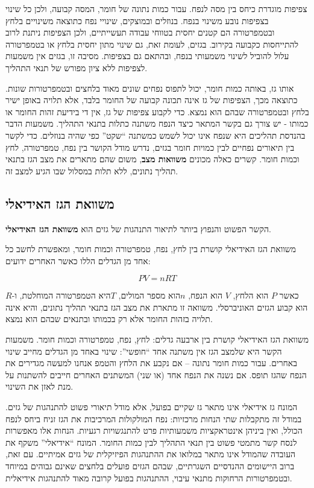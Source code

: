 \documentclass[
  hebrew,
  letterpaper,
  DIV=11,
  numbers=noendperiod]{scrreprt}
\begin{document}
צפיפות מוגדרת כיחס בין מסה לנפח. עבור כמות נתונה של חומר, המסה קבועה,
ולכן כל שינוי בצפיפות נובע משינוי בנפח. בנוזלים ובמוצקים, שינויי נפח
כתוצאה משינויים בלחץ ובטמפרטורה הם קטנים יחסית בטווחי עבודה תעשייתיים,
ולכן הצפיפות ניתנת לרוב להתייחסות כקבועה בקירוב. בגזים, לעומת זאת, גם
שינוי מתון יחסית בלחץ או בטמפרטורה עלול להוביל לשינוי משמעותי בנפח,
ובהתאם גם בצפיפות. מסיבה זו, בגזים אין משמעות לצפיפות ללא ציון מפורש של
תנאי התהליך.

אותו גז, באותה כמות חומר, יכול לתפוס נפחים שונים מאוד בלחצים ובטמפרטורות
שונות. כתוצאה מכך, הצפיפות של גז אינה תכונה קבועה של החומר בלבד, אלא
תלויה באופן ישיר בלחץ ובטמפרטורה שבהם הוא נמצא. כדי לקבוע צפיפות של גז,
אין די בידיעת זהות החומר או כמותו - יש צורך גם בקשר המתאר כיצד הנפח
משתנה כתלות בתנאי התהליך. משמעות הדבר בהנדסת תהליכים היא שנפח אינו יכול
לשמש כמשתנה ``שקט'' כפי שהיה בנוזלים. כדי לקשר בין תיאורים נפחיים לבין
כמויות חומר בגזים, נדרש מודל הקושר בין נפח, טמפרטורה, לחץ וכמות חומר.
קשרים כאלה מכונים \textbf{משוואות מצב}, משום שהם מתארים את מצב הגז בתנאי
תהליך נתונים, ללא תלות במסלול שבו הגיע למצב זה.

\subsection{משוואת הגז
האידיאלי}\label{ux5deux5e9ux5d5ux5d5ux5d0ux5ea-ux5d4ux5d2ux5d6-ux5d4ux5d0ux5d9ux5d3ux5d9ux5d0ux5dcux5d9}

הקשר הפשוט והנפוץ ביותר לתיאור התנהגות של גזים הוא \textbf{משוואת הגז
האידיאלי}.

משוואת הגז האידיאלי קושרת בין לחץ, נפח, טמפרטורה וכמות חומר, ומאפשרת
לחשב כל אחד מן הגדלים הללו כאשר האחרים ידועים:

\[PV = nRT\]

כאשר \(P\) הוא הלחץ, \(V\) הוא הנפח, \(n\)הוא מספר המולים, \(T\)היא
הטמפרטורה המוחלטת, ו-\(R\) הוא קבוע הגזים האוניברסלי. משוואה זו מתארת את
מצב הגז בתנאי תהליך נתונים, והיא אינה תלויה בזהות החומר אלא רק בכמותו
ובתנאים שבהם הוא נמצא.

משוואת הגז האידיאלי קושרת בין ארבעה גדלים: לחץ, נפח, טמפרטורה וכמות
חומר. משמעות הקשר היא שלמצב הגז אין משתנה אחד ``חופשי'': שינוי באחד מן
הגדלים מחייב שינוי באחרים. עבור כמות חומר נתונה -- אם נקבע את הלחץ
והטמפ\textquotesingle{} אנחנו למעשה מגדירים את הנפח שהגז תופס. אם נשנה
את הנפח אחד (או שני) המשתנים האחרים חייבים להשתנות על מנת לאזן את
השינוי.

המונח גז אידיאלי אינו מתאר גז שקיים בפועל, אלא מודל תיאורי פשוט להתנהגות
של גזים. במודל זה מתקבלות שתי הנחות מרכזיות: נפח המולקולות המרכיבות את
הגז זניח ביחס לנפח הכולל, ואין ביניהן אינטראקציות משמעותיות פרט
להתנגשויות רגעיות. הנחות אלו מאפשרות לנסח קשר מתמטי פשוט בין תנאי התהליך
לבין כמות החומר. המונח ``אידיאלי'' משקף את העובדה שהמודל אינו מתאר
במלואו את ההתנהגות הפיזיקלית של גזים אמיתיים. עם זאת, ברוב היישומים
ההנדסיים השגרתיים, שבהם הגזים פועלים בלחצים שאינם גבוהים במיוחד
ובטמפרטורות הרחוקות מתנאי עיבוי, ההתנהגות בפועל קרובה מאוד להתנהגות
אידיאלית.
\end{document}
